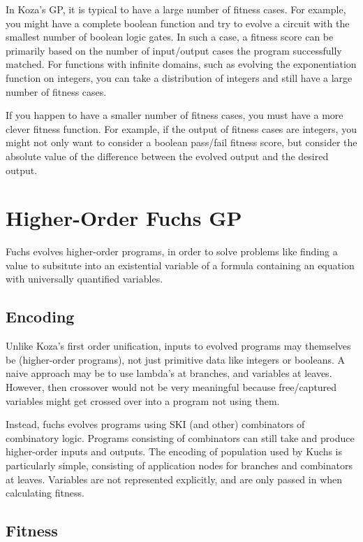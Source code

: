 \documentclass{article}
\begin{document}
In Koza's GP, it is typical to have a large number of fitness cases.
For example, you might have a complete boolean function and try to
evolve a circuit with the smallest number of boolean logic gates. In
such a case, a fitness score can be primarily based on the number of
input/output cases the program successfully matched. For functions
with infinite domains, such as evolving the exponentiation function on
integers, you can take a distribution of integers and still have a
large number of fitness cases.

If you happen to have a smaller number of fitness cases, you must have
a more clever fitness function. For example, if the output of fitness
cases are integers, you might not only want to consider a boolean
pass/fail fitness score, but consider the absolute value of the
difference between the evolved output and the desired output.

\section{Higher-Order Fuchs GP}

Fuchs evolves higher-order programs, in order to solve problems like
finding a value to subsitute into an existential variable of a formula
containing an equation with universally quantified variables.

\subsection{Encoding}

Unlike Koza's first order unification, inputs to evolved programs may
themselves be (higher-order programs), not just primitive data like
integers or booleans. A naive approach may be to use lambda's at
branches, and variables at leaves. However, then crossover would not
be very meaningful because free/captured variables might get crossed
over into a program not using them.

Instead, fuchs evolves programs using SKI (and other) combinators of
combinatory logic. Programs consisting of combinators can still take
and produce higher-order inputs and outputs. The encoding of
population used by Kuchs is particularly simple, consisting of
application nodes for branches and combinators at leaves. Variables
are not represented explicitly, and are only passed in when
calculating fitness.

\subsection{Fitness}
\end{document}

